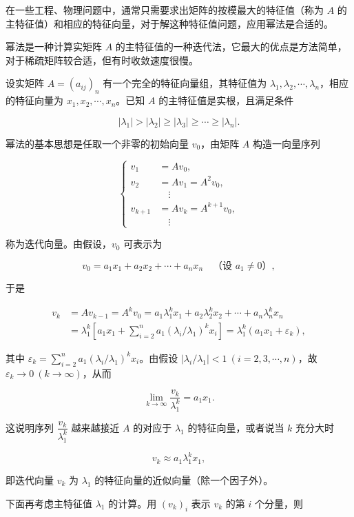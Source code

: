 在一些工程、物理问题中，通常只需要求出矩阵的按模最大的特征值（称为 \(A\) 的主特征值）和相应的特征向量，对于解这种特征值问题，应用幂法是合适的。

幂法是一种计算实矩阵 \(A\) 的主特征值的一种迭代法，它最大的优点是方法简单，对于稀疏矩阵较合适，但有时收敛速度很慢。

设实矩阵 \(A=(a_{ij})_n\) 有一个完全的特征向量组，其特征值为 \(\lambda_1,\lambda_2,\cdots,\lambda_n\)，相应的特征向量为 \(x_1,x_2,\cdots,x_n\)。已知 \(A\) 的主特征值是实根，且满足条件

\[
|\lambda_1|>|\lambda_2|\geq|\lambda_3|\geq\cdots\geq|\lambda_n|.
\tag{9.2.1}
\]

幂法的基本思想是任取一个非零的初始向量 \(v_0\)，由矩阵 \(A\) 构造一向量序列

\[
\left\{
\begin{aligned}
v_1&=Av_0,\\
v_2&=Av_1=A^2v_0,\\
&\quad\vdots\\
v_{k+1}&=Av_k=A^{k+1}v_0,\\
&\quad\vdots
\end{aligned}
\right.
\tag{9.2.2}
\]

称为迭代向量。由假设，\(v_0\) 可表示为

\[
v_0=a_1x_1+a_2x_2+\cdots+a_nx_n\quad\text{（设 }a_1\ne0\text{）},
\tag{9.2.3}
\]

于是

\[
\begin{aligned}
v_k&=Av_{k-1}=A^kv_0=a_1\lambda_1^kx_1+a_2\lambda_2^kx_2+\cdots+a_n\lambda_n^kx_n\\
&=\lambda_1^k\left[a_1x_1+\sum_{i=2}^na_1(\lambda_i/\lambda_1)^kx_i\right]=\lambda_1^k(a_1x_1+\varepsilon_k),
\end{aligned}
\]

其中 \(\varepsilon_k=\displaystyle\sum_{i=2}^na_1(\lambda_i/\lambda_1)^kx_i\)。由假设 \(|\lambda_i/\lambda_1|<1\ (i=2,3,\cdots,n)\)，故 \(\varepsilon_k\to0\ (k\to\infty)\)，从而

\[
\lim_{k\to\infty}\frac{v_k}{\lambda_1^k}=a_1x_1.
\tag{9.2.4}
\]

这说明序列 \(\dfrac{v_k}{\lambda_1^k}\) 越来越接近 \(A\) 的对应于 \(\lambda_1\) 的特征向量，或者说当 \(k\) 充分大时

\[
v_k\approx a_1\lambda_1^kx_1,
\tag{9.2.5}
\]

即迭代向量 \(v_k\) 为 \(\lambda_1\) 的特征向量的近似向量（除一个因子外）。

下面再考虑主特征值 \(\lambda_1\) 的计算。用 \((v_k)_i\) 表示 \(v_k\) 的第 \(i\) 个分量，则

